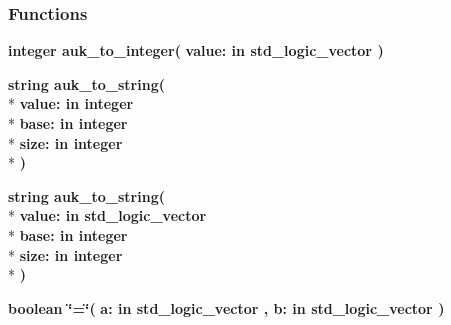 \subsubsection*{Functions}
 \begin{DoxyCompactItemize}
\item 
{\bfseries {\bfseries \textcolor{comment}{integer}\textcolor{vhdlchar}{ }}} {\bf auk\+\_\+to\+\_\+integer}{\bfseries  ( }{\bfseries \textcolor{vhdlchar}{value\+: }\textcolor{stringliteral}{in }{\bfseries \textcolor{comment}{std\+\_\+logic\+\_\+vector}\textcolor{vhdlchar}{ }}}{\bfseries  )} 
\item 
{\bfseries {\bfseries \textcolor{comment}{string}\textcolor{vhdlchar}{ }}} {\bf auk\+\_\+to\+\_\+string}{\bfseries  ( }\\*
{\bfseries \textcolor{vhdlchar}{value\+: }\textcolor{stringliteral}{in }{\bfseries \textcolor{comment}{integer}\textcolor{vhdlchar}{ }}}\\*
{\bfseries \textcolor{vhdlchar}{base\+: }\textcolor{stringliteral}{in }{\bfseries \textcolor{comment}{integer}\textcolor{vhdlchar}{ }}}\\*
{\bfseries \textcolor{vhdlchar}{size\+: }\textcolor{stringliteral}{in }{\bfseries \textcolor{comment}{integer}\textcolor{vhdlchar}{ }}}\\*
{\bfseries  )} 
\item 
{\bfseries {\bfseries \textcolor{comment}{string}\textcolor{vhdlchar}{ }}} {\bf auk\+\_\+to\+\_\+string}{\bfseries  ( }\\*
{\bfseries \textcolor{vhdlchar}{value\+: }\textcolor{stringliteral}{in }{\bfseries \textcolor{comment}{std\+\_\+logic\+\_\+vector}\textcolor{vhdlchar}{ }}}\\*
{\bfseries \textcolor{vhdlchar}{base\+: }\textcolor{stringliteral}{in }{\bfseries \textcolor{comment}{integer}\textcolor{vhdlchar}{ }}}\\*
{\bfseries \textcolor{vhdlchar}{size\+: }\textcolor{stringliteral}{in }{\bfseries \textcolor{comment}{integer}\textcolor{vhdlchar}{ }}}\\*
{\bfseries  )} 
\item 
{\bfseries {\bfseries \textcolor{comment}{boolean}\textcolor{vhdlchar}{ }}} {\bf \char`\"{}=\char`\"{}}{\bfseries  ( }{\bfseries \textcolor{vhdlchar}{a\+: }\textcolor{stringliteral}{in }{\bfseries \textcolor{comment}{std\+\_\+logic\+\_\+vector}\textcolor{vhdlchar}{ }}}{\bfseries  , \textcolor{vhdlchar}{b\+: }\textcolor{stringliteral}{in }{\bfseries \textcolor{comment}{std\+\_\+logic\+\_\+vector}\textcolor{vhdlchar}{ }}}{\bfseries  )} 

\end{DoxyCompactItemize}
